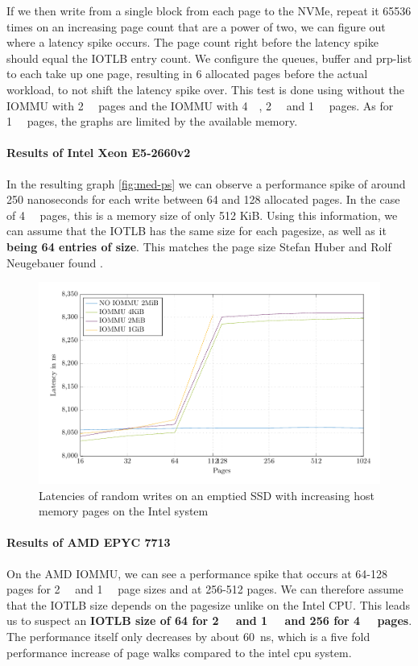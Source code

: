 If we then write from a single block from each page to the NVMe, repeat it 65536 times on an increasing page count that are a power of two, we can figure out where a latency spike occurs. The page count right before the latency spike should equal the IOTLB entry count. We configure the queues, buffer and prp-list to each take up one page, resulting in 6 allocated pages before the actual workload, to not shift the latency spike over. This test is done using without the IOMMU with \qty{2}{\mebi\byte} pages and the IOMMU with \qty{4}{\kibi\byte}, \qty{2}{\mebi\byte} and \qty{1}{\gibi\byte} pages. As for \qty{1}{\gibi\byte} pages, the graphs are limited by the available memory.

\paragraph{Results of Intel Xeon E5-2660v2}
In the resulting graph \autoref{fig:med-ps} we can observe a performance spike of around 250 nanoseconds for each write between 64 and 128 allocated pages. In the case of \qty{4}{\kibi\byte} pages, this is a memory size of only 512 KiB. Using this information, we can assume that the IOTLB has the same size for each pagesize, as well as it \textbf{being 64 entries of size}. This matches the page size Stefan Huber and Rolf Neugebauer found \cite{iommuhuber}\cite{pcieperfnegebauer}.

\begin{figure}[H]
  \centering
  \includegraphics[width=\textwidth]{figures/psmeds}
  \caption{Latencies of random writes on an emptied SSD with increasing host memory pages on the Intel system}
  \label{fig:med-ps}
\end{figure}

\paragraph{Results of AMD EPYC 7713}
On the AMD IOMMU, we can see a performance spike that occurs at 64-128 pages for \qty{2}{\mebi\byte} and \qty{1}{\gibi\byte} page sizes and at 256-512 pages. We can therefore assume that the IOTLB size depends on the pagesize unlike on the Intel CPU. This leads us to suspect an \textbf{IOTLB size of 64 for \qty{2}{\mebi\byte} and \qty{1}{\gibi\byte} and 256 for \qty{4}{\kibi\byte} pages}. The performance itself only decreases by about \qty{60}{ns}, which is a five fold performance increase of page walks compared to the intel cpu system.

